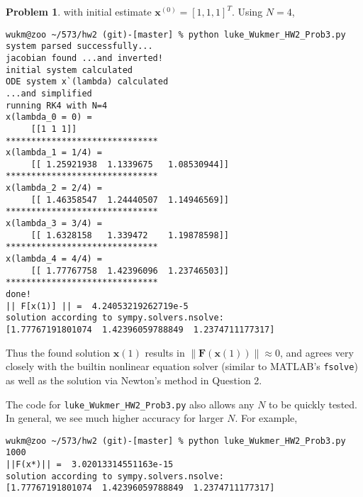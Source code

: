\documentclass[10pt]{article}
\theoremstyle{plain}
\theoremstyle{definition}
\newtheorem{prob}{Problem}
\numberwithin{equation}{section}
\newcommand{\norm}[1]{\left\lVert#1\right\rVert}
\begin{document}
\begin{prob}
with initial estimate $\bm{x}^{(0)} = [1,1,1]^T$. Using $N=4$, 
\begin{small}
\begin{verbatim}
wukm@zoo ~/573/hw2 (git)-[master] % python luke_Wukmer_HW2_Prob3.py 
system parsed successfully...
jacobian found ...and inverted! 
initial system calculated
ODE system x`(lambda) calculated
...and simplified
running RK4 with N=4
x(lambda_0 = 0) =
	 [[1 1 1]]
******************************
x(lambda_1 = 1/4) = 
	 [[ 1.25921938  1.1339675   1.08530944]]
******************************
x(lambda_2 = 2/4) = 
	 [[ 1.46358547  1.24440507  1.14946569]]
******************************
x(lambda_3 = 3/4) = 
	 [[ 1.6328158   1.339472    1.19878598]]
******************************
x(lambda_4 = 4/4) = 
	 [[ 1.77767758  1.42396096  1.23746503]]
******************************
done!
|| F[x(1)] || =  4.24053219262719e-5
solution according to sympy.solvers.nsolve:
[1.77767191801074  1.42396059788849  1.2374711177317]
\end{verbatim}
\end{small}

Thus the found solution $\bm{x}(1)$ results in $\norm{\bm{F}(\bm{x}(1))} \approx 0$,
and agrees very closely with the builtin nonlinear equation solver
(similar to MATLAB's \texttt{fsolve}) as well as the solution via Newton's method in Question 2.

The code for \texttt{luke\_Wukmer\_HW2\_Prob3.py} also allows any $N$ to be quickly tested. In general,
we see much higher accuracy for larger $N$. For example,
\begin{small}
    \begin{verbatim}
wukm@zoo ~/573/hw2 (git)-[master] % python luke_Wukmer_HW2_Prob3.py 1000
||F(x*)|| =  3.02013314551163e-15
solution according to sympy.solvers.nsolve:
[1.77767191801074  1.42396059788849  1.2374711177317]
    \end{verbatim}
\end{small}

\end{prob}
\end{document}
